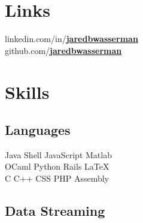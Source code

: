 \documentclass[letterpaper]{resume}
\begin{document}



\begin{minipage}[t]{0.33\textwidth} %


\section{Links}
linkedin.com/in/\href{https://www.linkedin.com/in/jaredbwasserman/}{\bf jaredbwasserman} \\
github.com/\href{https://github.com/jaredbwasserman}{\bf jaredbwasserman}

\sectionspace %


\section{Skills}

\subsection{Languages}
Java \textbullet{} Shell \textbullet{} JavaScript \textbullet{} Matlab \\
OCaml \textbullet{} Python \textbullet{} Rails \textbullet{} \LaTeX\ \\
C \textbullet{} C++ \textbullet{} CSS \textbullet{} PHP \textbullet{} Assembly \\

\subsection{Data Streaming}


\end{minipage}
\end{document}
